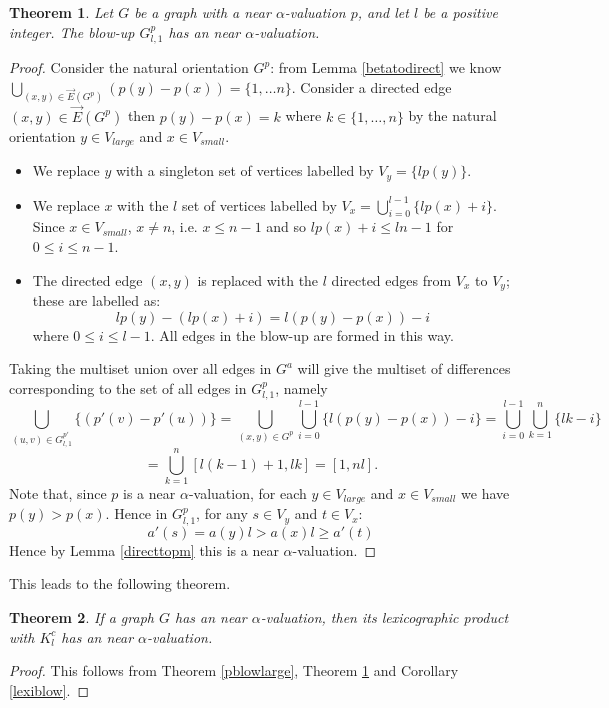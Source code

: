 \documentclass[12pt, a4paper]{article}
\newtheorem{theorem}{Theorem}[section]
\theoremstyle{definition}
\begin{document}
\begin{theorem}\label{pblowsmall}
    Let $G$ be a graph with a near $\alpha$-valuation $p$, and let $l$ be a positive integer. The blow-up $G^p_{l,1}$ has an near $\alpha$-valuation.
\end{theorem}
\begin{proof}
Consider the natural orientation $G^p$: from Lemma \ref{betatodirect} we know $\bigcup_{(x,y)\in \overrightarrow{E}(G^p)} (p(y)-p(x) ) =\{1, \ldots n\}$. Consider a directed edge $(x,y) \in \overrightarrow{E}(G^p)$ then $p(y)-p(x)=k$ where $k\in \{1,\ldots,n\}$ by the natural orientation $y \in V_{large}$ and $x \in V_{small}$. 

\begin{itemize}
\item We replace $y$ with a singleton set of vertices labelled by $V_y=\{lp(y)\}$.
\item We replace $x$ with the $l$ set of vertices labelled by $V_x =\bigcup_{i=0}^{l-1}\{lp(x)+i\}$.
Since $x \in V_{small}$, $x \neq n$, i.e. $x \leq n-1$ and so $lp(x)+i \leq ln-1$ for $0 \leq i \leq n-1$.
\item  The directed edge $(x,y)$ is replaced with the $l$ directed edges from $V_x$ to $V_y$; these are labelled as:
\[lp(y)-(lp(x)+i)= l(p(y)-p(x))-i\]
where $0 \leq i \leq l-1.$ All edges in the blow-up are formed in this way. 
\end{itemize}

Taking the multiset union over all edges in $G^a$ will give the multiset of differences corresponding to the set of all edges in $G^p_{l,1}$, namely 
\[\bigcup_{(u,v) \in G^{p'}_{l,1}}\{(p'(v)-p'(u))\}=\bigcup_{(x,y) \in G^p}\bigcup_{i =0}^{l-1}\{l(p(y)-p(x))-i\}=\bigcup_{i =0}^{l-1}\bigcup_{k=1}^{n}\{lk-i\}\]
\[=\bigcup_{k=1}^{n}[l(k-1)+1,lk] = [1,nl].\]
Note that, since $p$ is a near $\alpha$-valuation, for each $ y \in V_{large}$ and $x \in V_{small}$ we have $p(y) >  p(x)$. Hence in $G^p_{l,1}$, for any $s \in V_y$ and $t \in V_x$:
    \[a'(s) = a(y)l >  a(x)l \geq a'(t)\]
Hence by Lemma \ref{directtopm} this is a near $\alpha$-valuation.
\end{proof}


This leads to the following theorem.

\begin{theorem}\label{blowp}
If a graph $G$ has an near $\alpha$-valuation, then its lexicographic product with $K^c_l$ has an near $\alpha$-valuation.
\end{theorem}
\begin{proof}
    This follows from Theorem \ref{pblowlarge}, Theorem \ref{pblowsmall} and Corollary \ref{lexiblow}.
\end{proof}
\end{document}
